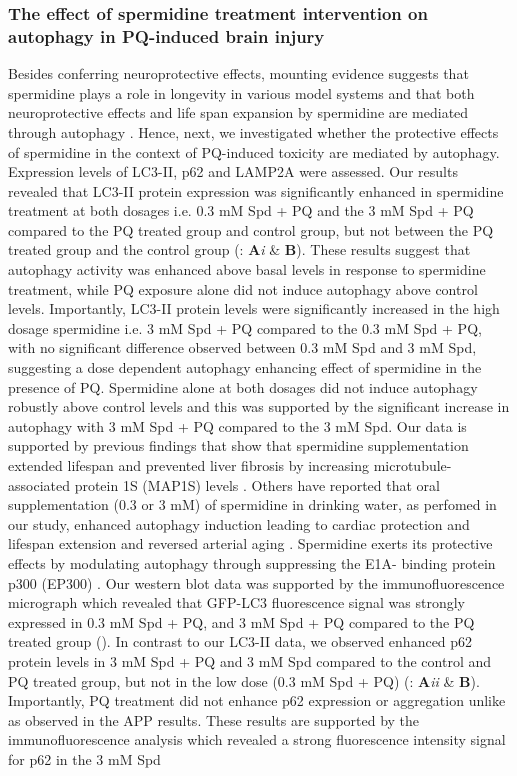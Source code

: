 \subsubsection{The effect of spermidine treatment intervention on autophagy in PQ-induced brain injury}
Besides conferring neuroprotective effects, mounting evidence suggests that spermidine plays a role in longevity in various model systems \citep{Eisenberg2009,Garcia-Prat2016,Minois2012,Morselli2011,Pietrocola2015} and that both neuroprotective effects and life span expansion by spermidine are mediated through autophagy \citep{Eisenberg2009,Gupta2016,Gupta2013,Minois2012,Yue2017}. Hence, next, we investigated whether the protective effects of spermidine in the context of PQ-induced toxicity are mediated by autophagy. Expression levels of LC3-II, p62 and LAMP2A were assessed. Our results revealed that LC3-II protein expression was significantly enhanced in spermidine treatment at both dosages i.e. 0.3 mM Spd + PQ and the 3 mM Spd + PQ compared to the PQ treated group and control group, but not between the PQ treated group and the control group (: \textbf{A}\textit{i} \& \textbf{B}). These results suggest that autophagy activity was enhanced above basal levels in response to spermidine treatment, while PQ exposure alone did not induce autophagy above control levels. Importantly, LC3-II protein levels were significantly increased in the high dosage spermidine i.e. 3 mM Spd + PQ compared to the 0.3 mM Spd + PQ, with no significant difference observed between 0.3 mM Spd and 3 mM Spd, suggesting a dose dependent autophagy enhancing effect of spermidine in the presence of PQ. Spermidine alone at both dosages did not induce autophagy robustly above control levels and this was supported by the significant increase in autophagy with 3 mM Spd + PQ compared to the 3 mM Spd. Our data is supported by previous findings that show that spermidine supplementation extended lifespan and prevented liver fibrosis by increasing microtubule-associated protein 1S (MAP1S) levels \citep{Yue2017}. Others have reported that oral supplementation (0.3 or 3 mM) of spermidine in drinking water, as perfomed in our study, enhanced autophagy induction leading to cardiac protection and lifespan extension \citep{Eisenberg2016a} and reversed arterial aging \citep{LaRocca2013}. Spermidine exerts its protective effects by modulating autophagy through suppressing the E1A- binding protein p300 (EP300) \citep{Pietrocola2015}. Our western blot data was supported by the immunofluorescence micrograph which revealed that GFP-LC3 fluorescence signal was strongly expressed in 0.3 mM Spd + PQ, and 3 mM Spd + PQ compared to the PQ treated group (). In contrast to our LC3-II data, we observed enhanced p62 protein levels in 3 mM Spd + PQ and 3 mM Spd compared to the control and PQ treated group, but not in the low dose (0.3 mM Spd + PQ) (: \textbf{A}\textit{ii} \& \textbf{B}). Importantly, PQ treatment did not enhance p62 expression or aggregation unlike as observed in the APP results. These results are supported by the immunofluorescence analysis which revealed a strong fluorescence intensity signal for p62 in the 3 mM Spd 